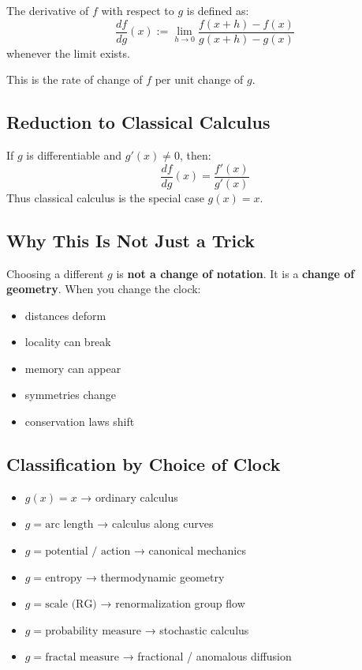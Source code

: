 \documentclass[12pt, oneside]{article}
\begin{document}
The derivative of $f$ with respect to $g$ is defined as:
\begin{equation}
\frac{df}{dg}(x) := \lim_{h \to 0} \frac{f(x+h) - f(x)}{g(x+h) - g(x)}
\end{equation}
whenever the limit exists.

This is the rate of change of $f$ per unit change of $g$.

\subsection{Reduction to Classical Calculus}

If $g$ is differentiable and $g'(x) \neq 0$, then:
\begin{equation}
\frac{df}{dg}(x) = \frac{f'(x)}{g'(x)}
\end{equation}
Thus classical calculus is the special case $g(x) = x$.

\subsection{Why This Is Not Just a Trick}

Choosing a different $g$ is \textbf{not a change of notation}. It is a \textbf{change of geometry}. When you change the clock:
\begin{itemize}
    \item distances deform
    \item locality can break
    \item memory can appear
    \item symmetries change
    \item conservation laws shift
\end{itemize}

\subsection{Classification by Choice of Clock}

\begin{itemize}
    \item $g(x) = x$ → ordinary calculus
    \item $g = \text{arc length}$ → calculus along curves
    \item $g = \text{potential / action}$ → canonical mechanics
    \item $g = \text{entropy}$ → thermodynamic geometry
    \item $g = \text{scale (RG)}$ → renormalization group flow
    \item $g = \text{probability measure}$ → stochastic calculus
    \item $g = \text{fractal measure}$ → fractional / anomalous diffusion
\end{itemize}
\end{document}

